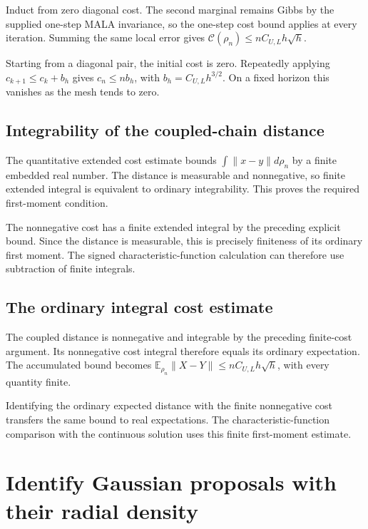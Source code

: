 \documentclass[11pt,a4paper]{article}
\begin{document}
Induct from zero diagonal cost. The second marginal remains Gibbs by the supplied one-step MALA invariance, so the one-step cost bound applies at every iteration. Summing the same local error gives \(\mathcal C(\rho_n)\le nC_{U,L}h\sqrt h\).



Starting from a diagonal pair, the initial cost is zero. Repeatedly applying \(c_{k+1}\le c_k+b_h\) gives \(c_n\le n b_h\), with \(b_h=C_{U,L}h^{3/2}\). On a fixed horizon this vanishes as the mesh tends to zero.


\subsection{\texorpdfstring{Integrability of the coupled-chain distance}{Integrability of the coupled-chain distance}}


The quantitative extended cost estimate bounds \(\int\|x-y\|d\rho_n\) by a finite embedded real number. The distance is measurable and nonnegative, so finite extended integral is equivalent to ordinary integrability. This proves the required first-moment condition.



The nonnegative cost has a finite extended integral by the preceding explicit bound. Since the distance is measurable, this is precisely finiteness of its ordinary first moment. The signed characteristic-function calculation can therefore use subtraction of finite integrals.


\subsection{\texorpdfstring{The ordinary integral cost estimate}{The ordinary integral cost estimate}}


The coupled distance is nonnegative and integrable by the preceding finite-cost argument. Its nonnegative cost integral therefore equals its ordinary expectation. The accumulated bound becomes \(\mathbb E_{\rho_n}\|X-Y\|\le nC_{U,L}h\sqrt h\), with every quantity finite.



Identifying the ordinary expected distance with the finite nonnegative cost transfers the same bound to real expectations. The characteristic-function comparison with the continuous solution uses this finite first-moment estimate.


\section{\texorpdfstring{Identify Gaussian proposals with their radial density}{Identify Gaussian proposals with their radial density}}
\end{document}
